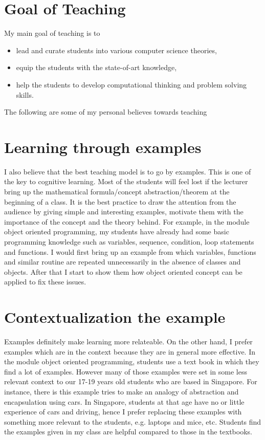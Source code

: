 \documentclass[12pt]{article}
\theoremstyle{plain} \numberwithin{equation}{section}
\theoremstyle{definition}
\begin{document}
\raisebox{1cm}

\section{Goal of Teaching}
My main goal of teaching is to
\begin{itemize}
   \item lead and curate students into various computer science theories,
   \item equip the students with the state-of-art knowledge,
   \item help the students to develop computational thinking and problem solving skills. 
\end{itemize}
%
The following are some of my personal believes towards teaching

\section{Learning through examples}
I also believe that the best teaching model is to go by examples.
This is one of the key to cognitive learning. Most of the students will
feel lost if the lecturer bring up the mathematical formula/concept abstraction/theorem
at the beginning of a class. It is the best practice to draw the attention
from the audience by giving simple and interesting examples, motivate them with 
the importance of the concept and the theory behind. For example, in
the module object oriented programming, my students have already had some basic programming knowledge such as variables,
sequence, condition, loop statements and functions. I would first
bring up an example from which variables, functions and similar routine are
repeated unnecessarily in the absence of classes and objects. After
that I start to show them how object oriented concept can be applied
to fix these issues.

\section{Contextualization the example}
Examples definitely make learning more relateable. On the other hand,
I prefer examples which are in the context because they are in general
more effective. In the module object oriented programming, students
use a text book in which they find a lot of examples. However many of
those examples were set in some less relevant context to our 17-19
years old students who are based in Singapore. For instance, there is
this example tries to make an analogy of abstraction and encapsulation
using cars. In Singapore, students at that age have no or little
experience of cars and driving, hence I prefer replacing these
examples with something more relevant to the students, e.g. laptops
and mice, etc. Students find the examples given in my class are
helpful compared to those in the textbooks.
\end{document}

